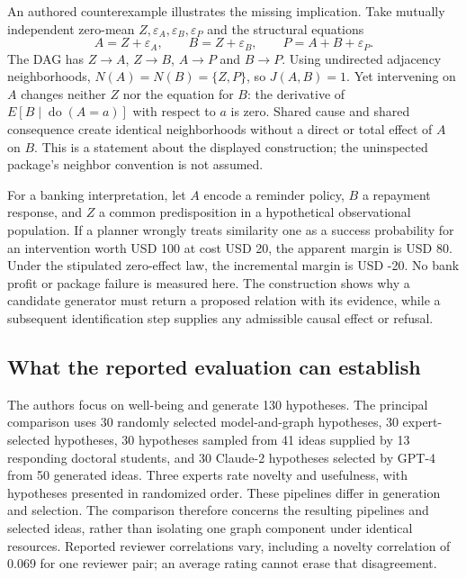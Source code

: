 An authored counterexample illustrates the missing implication. Take mutually independent zero-mean $Z,\varepsilon_A,\varepsilon_B,\varepsilon_P$ and the structural equations
\begin{equation}
 A=Z+\varepsilon_A,\qquad B=Z+\varepsilon_B,
 \qquad P=A+B+\varepsilon_P.
 \label{exec20:hypothesis-world}
\end{equation}
The DAG has $Z\to A$, $Z\to B$, $A\to P$ and $B\to P$. Using undirected adjacency neighborhoods, $N(A)=N(B)=\{Z,P\}$, so $J(A,B)=1$. Yet intervening on $A$ changes neither $Z$ nor the equation for $B$: the derivative of $E[B\mid\operatorname{do}(A=a)]$ with respect to $a$ is zero. Shared cause and shared consequence create identical neighborhoods without a direct or total effect of $A$ on $B$. This is a statement about the displayed construction; the uninspected package's neighbor convention is not assumed.\citep{exec20_hypothesis_reference}

For a banking interpretation, let $A$ encode a reminder policy, $B$ a repayment response, and $Z$ a common predisposition in a hypothetical observational population. If a planner wrongly treats similarity one as a success probability for an intervention worth USD 100 at cost USD 20, the apparent margin is USD 80. Under the stipulated zero-effect law, the incremental margin is USD -20. No bank profit or package failure is measured here. The construction shows why a candidate generator must return a proposed relation with its evidence, while a subsequent identification step supplies any admissible causal effect or refusal.

\subsection{What the reported evaluation can establish}
\label{exec20:hypothesis-evaluation}
The authors focus on well-being and generate 130 hypotheses. The principal comparison uses 30 randomly selected model-and-graph hypotheses, 30 expert-selected hypotheses, 30 hypotheses sampled from 41 ideas supplied by 13 responding doctoral students, and 30 Claude-2 hypotheses selected by GPT-4 from 50 generated ideas. Three experts rate novelty and usefulness, with hypotheses presented in randomized order. These pipelines differ in generation and selection. The comparison therefore concerns the resulting pipelines and selected ideas, rather than isolating one graph component under identical resources. Reported reviewer correlations vary, including a novelty correlation of 0.069 for one reviewer pair; an average rating cannot erase that disagreement.\citep{exec20_hypothesis_generation}


